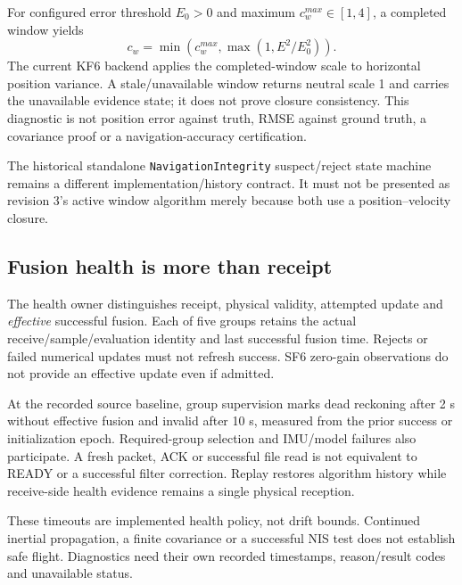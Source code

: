 For configured error threshold $E_0>0$ and maximum $c_w^{max}\in[1,4]$, a completed window yields
\begin{equation}
c_w=\min(c_w^{max},\max(1,E^2/E_0^2)).
\end{equation}
The current KF6 backend applies the completed-window scale to horizontal position variance. A stale/unavailable window returns neutral scale 1 and carries the unavailable evidence state; it does not prove closure consistency. This diagnostic is not position error against truth, RMSE against ground truth, a covariance proof or a navigation-accuracy certification.

The historical standalone \texttt{NavigationIntegrity} suspect/reject state machine remains a different implementation/history contract. It must not be presented as revision 3's active window algorithm merely because both use a position--velocity closure.


\subsection{Fusion health is more than receipt}
The health owner distinguishes receipt, physical validity, attempted update and \emph{effective} successful fusion. Each of five groups retains the actual receive/sample/evaluation identity and last successful fusion time. Rejects or failed numerical updates must not refresh success. SF6 zero-gain observations do not provide an effective update even if admitted.

At the recorded source baseline, group supervision marks dead reckoning after 2 s without effective fusion and invalid after 10 s, measured from the prior success or initialization epoch. Required-group selection and IMU/model failures also participate. A fresh packet, ACK or successful file read is not equivalent to READY or a successful filter correction. Replay restores algorithm history while receive-side health evidence remains a single physical reception.

These timeouts are implemented health policy, not drift bounds. Continued inertial propagation, a finite covariance or a successful NIS test does not establish safe flight. Diagnostics need their own recorded timestamps, reason/result codes and unavailable status.

